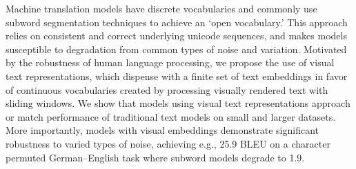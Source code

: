 Machine translation models have discrete vocabularies and commonly use subword segmentation techniques to achieve an `open vocabulary.' This approach relies on consistent and correct underlying unicode sequences, and makes models susceptible to degradation from common types of noise and variation. Motivated by the robustness of human language processing, we propose the use of visual text representations, which dispense with a finite set of text embeddings in favor of continuous vocabularies created by processing visually rendered text with sliding windows. We show that models using visual text representations approach or match performance of traditional text models on small and larger datasets. More importantly, models with visual embeddings demonstrate significant robustness to varied types of noise, achieving e.g., 25.9 BLEU on a character permuted German--English task where subword models degrade to 1.9.
